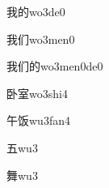 \begin{verbete}[7;8]{我的}{wo3de0}
\end{verbete}

\begin{verbete}[7;5]{我们}{wo3men0}
\end{verbete}

\begin{verbete}[7;5;8]{我们的}{wo3men0de0}
\end{verbete}

\begin{verbete}[8;9]{卧室}{wo3shi4}
\end{verbete}

\begin{verbete}[4;7]{午饭}{wu3fan4}
\end{verbete}

\begin{verbete}[4]{五}{wu3}
\end{verbete}

\begin{verbete}[14]{舞}{wu3}
\end{verbete}

